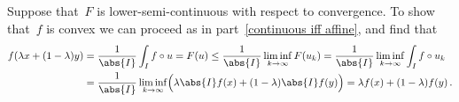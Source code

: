 \subsection{}

Suppose that~$F$ is lower-semi-continuous with respect to {\weakstar} convergence.
To show that~$f$ is convex we can proceed as in part~\ref{continuous iff affine}, and find that
\begin{align*}
  f( \lambda x + (1-\lambda) y )
  &=
  \frac{1}{\abs{I}} \int_I f \circ u
  =
  F(u)
  \leq
  \frac{1}{\abs{I}} \liminf_{k \to \infty} F(u_k)
  =
  \frac{1}{\abs{I}} \liminf_{k \to \infty} \int_I f \circ u_k
  \\
  &=
  \frac{1}{\abs{I}}
  \liminf_{k \to \infty} \Bigl( \lambda \abs{I} f(x) + (1 - \lambda) \abs{I} f(y) \Bigr)
  =
  \lambda f(x) + (1 - \lambda) f(y) \,.
\end{align*}
































